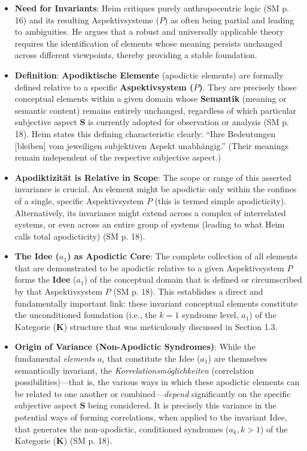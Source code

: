 \documentclass[12pt]{article}
\newcommand{\q}[1]{\enquote{#1}}
\newcommand{\kategorie}{\bm{K}}
\newcommand{\conceptualsyndrome}{a}
\newcommand{\aspektivsystem}{P}
\begin{document}
\begin{itemize}
    \item \textbf{Need for Invariants}: Heim critiques purely anthropocentric logic (SM p. 16) and its resulting Aspektivsysteme (\(\aspektivsystem\)) as often being partial and leading to ambiguities. He argues that a robust and universally applicable theory requires the identification of elements whose meaning persists unchanged across different viewpoints, thereby providing a stable foundation.
    \item \textbf{Definition}: \textbf{Apodiktische Elemente} (apodictic elements) are formally defined relative to a specific \textbf{Aspektivsystem (\(\aspektivsystem\))}. They are precisely those conceptual elements within a given domain whose \textbf{Semantik} (meaning or semantic content) remains entirely unchanged, regardless of which particular subjective aspect \( \mathbf{S} \) is currently adopted for observation or analysis (SM p. 18). Heim states this defining characteristic clearly: \q{Ihre Bedeutungen [bleiben] vom jeweiligen subjektiven Aspekt unabhängig.} (Their meanings remain independent of the respective subjective aspect.)
    \item \textbf{Apodiktizit\"{a}t is Relative in Scope}: The scope or range of this asserted invariance is crucial. An element might be apodictic only within the confines of a single, specific Aspektivsystem \( \aspektivsystem \) (this is termed simple apodicticity). Alternatively, its invariance might extend across a complex of interrelated systems, or even across an entire group of systems (leading to what Heim calls total apodicticity) (SM p. 18).
    \item \textbf{The Idee (\(\conceptualsyndrome_1\)) as Apodictic Core}: The complete collection of all elements that are demonstrated to be apodictic relative to a given Aspektivsystem \( \aspektivsystem \) forms the \textbf{Idee} (\(\conceptualsyndrome_1\)) of the conceptual domain that is defined or circumscribed by that Aspektivsystem \( \aspektivsystem \) (SM p. 18). This establishes a direct and fundamentally important link: these invariant conceptual elements constitute the unconditioned foundation (i.e., the \( k=1 \) syndrome level, \( \conceptualsyndrome_1 \)) of the Kategorie (\(\kategorie\)) structure that was meticulously discussed in Section 1.3.
    \item \textbf{Origin of Variance (Non-Apodictic Syndromes)}: While the fundamental \textit{elements} \( a_i \) that constitute the Idee (\(\conceptualsyndrome_1\)) are themselves semantically invariant, the \textit{Korrelationsmöglichkeiten} (correlation possibilities)—that is, the various ways in which these apodictic elements can be related to one another or combined—\textit{depend} significantly on the specific subjective aspect \( \mathbf{S} \) being considered. It is precisely this variance in the potential ways of forming correlations, when applied to the invariant Idee, that generates the non-apodictic, conditioned syndromes (\( \conceptualsyndrome_k, k>1 \)) of the Kategorie (\(\kategorie\)) (SM p. 18).

\end{itemize}
\end{document}
